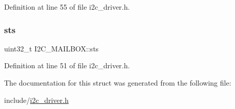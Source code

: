 Definition at line 55 of file i2c\+\_\+driver.\+h.

\mbox{\label{structI2C__MAILBOX_ace1f82d629413aece6f78bf81c0991f8}} 
\subsubsection{\texorpdfstring{sts}{sts}}
{\footnotesize\ttfamily uint32\+\_\+t I2\+C\+\_\+\+M\+A\+I\+L\+B\+O\+X\+::sts}



Definition at line 51 of file i2c\+\_\+driver.\+h.



The documentation for this struct was generated from the following file\+:\begin{DoxyCompactItemize}
\item 
include/\mbox{\hyperlink{i2c__driver_8h}{i2c\+\_\+driver.\+h}}\end{DoxyCompactItemize}
